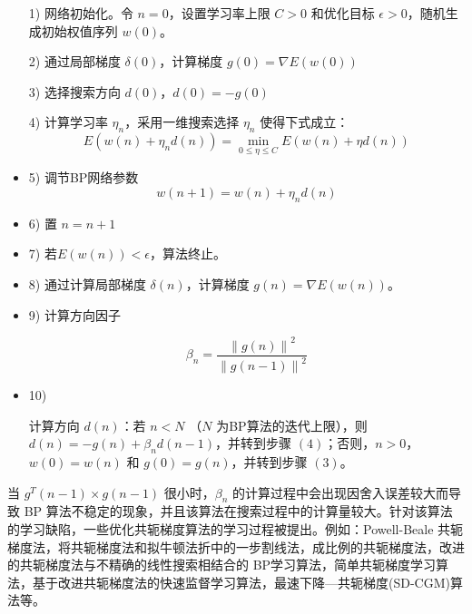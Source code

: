\documentclass[UTF8]{ctexart}
\begin{document}
\begin{itemize}
\item [1)]
网络初始化。令 $n = 0$，设置学习率上限 $C > 0$ 和优化目标 $\epsilon > 0$，随机生成初始权值序列 $w(0)$。
\item [2)]
通过局部梯度 $\delta (0)$，计算梯度 $g(0) = \nabla E(w(0))$
\item [3)]
选择搜索方向 $d(0)$，$d(0) = -g(0)$
\item [4)]
计算学习率 $\eta_n$，采用一维搜索选择 $\eta_n$ 使得下式成立：
\begin{equation}
E(w(n) + \eta_n d(n)) = \min \limits_{0 \le \eta \le C} E(w(n) + \eta d(n))
\end {equation}
\item [5)]
调节BP网络参数
\begin{equation}
w(n+1) = w(n) + \eta_n d(n)
\end {equation}

\item [6)]
置 $n = n + 1$

\item [7)]
若$E(w(n)) < \epsilon$，算法终止。

\item [8)]
通过计算局部梯度 $\delta(n)$，计算梯度 $g(n) = \nabla E(w(n))$。

\item [9)]
计算方向因子 

\begin{equation}
\beta_n = \frac{\left\lVert g(n) \right\rVert^2}{\left\lVert g(n-1) \right\rVert^2}
\end{equation}

\item [10)]

计算方向 $d(n)$：若 $n < N$ （$N$ 为BP算法的迭代上限），则 $d(n) = -g(n) + \beta_n d(n-1)$，并转到步骤 $(4)$；否则，$n > 0$，$w(0) = w(n)$ 和 $g(0) = g(n)$，并转到步骤 $(3)$。

\end{itemize}

当 $g^T(n-1) \times g(n-1)$ 很小时，$\beta_n$ 的计算过程中会出现因舍入误差较大而导致 BP 算法不稳定的现象，并且该算法在搜索过程中的计算量较大。针对该算法的学习缺陷，一些优化共轭梯度算法的学习过程被提出。例如：Powell-Beale 共轭梯度法，将共轭梯度法和拟牛顿法折中的一步割线法，成比例的共轭梯度法，改进的共轭梯度法与不精确的线性搜索相结合的 BP学习算法，简单共轭梯度学习算法，基于改进共轭梯度法的快速监督学习算法，最速下降—共轭梯度(SD-CGM)算法等。 \par
\end{document}
